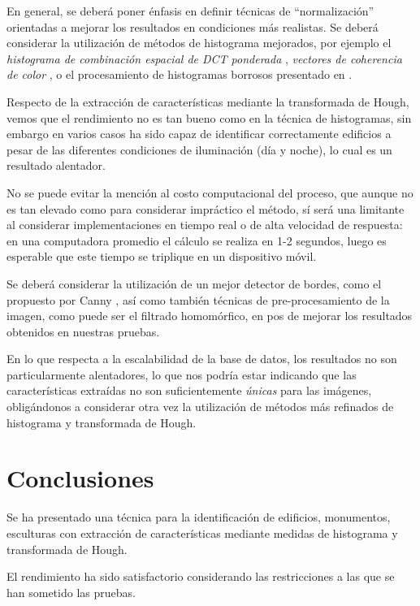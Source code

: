 \documentclass[conference,a4paper,10pt,oneside,final]{tfmpd}
\begin{document}
En general, se deberá poner énfasis en definir técnicas
de ``normalización'' orientadas a mejorar los resultados en condiciones más
realistas. Se deberá considerar la utilización de métodos de histograma
mejorados, por ejemplo el \emph{histograma de combinación espacial de DCT
ponderada} \cite{wdctsch}, \emph{vectores de coherencia de
color} \cite{Pass96histogramrefinement}, o el procesamiento de
histogramas borrosos presentado en \cite{Konstantinidis2005375}.

Respecto de la extracción de características mediante la transformada de Hough,
vemos que el rendimiento no es tan bueno como en la técnica de histogramas,
sin embargo en varios casos ha sido capaz de identificar correctamente edificios
a pesar de las diferentes condiciones de iluminación (día y noche), lo cual
es un resultado alentador.

No se puede evitar la mención al costo computacional del proceso, que aunque
no es tan elevado como para considerar impráctico el método, sí será una
limitante al considerar implementaciones en tiempo real o de alta velocidad
de respuesta: en una computadora promedio el cálculo se realiza en 1-2 segundos,
luego es esperable que este tiempo se triplique en un dispositivo móvil.

Se deberá considerar la utilización de un mejor detector de bordes, como el
propuesto por Canny \cite{canny},
así como también técnicas de pre-procesamiento de la
imagen, como puede ser el filtrado homomórfico, en pos de mejorar los
resultados obtenidos en nuestras pruebas.

En lo que respecta a la escalabilidad de la base de datos, los resultados no
son particularmente alentadores, lo que nos {podría estar
indicando que las características extraídas no son suficientemente \emph{únicas}
para las imágenes, obligándonos} a considerar otra vez la
utilización de métodos más refinados de histograma y transformada de Hough.
%
%
%
%
\section{Conclusiones}
Se ha presentado una técnica para la identificación de edificios, monumentos,
esculturas con extracción de características mediante medidas de histograma
y transformada de Hough.

El rendimiento ha sido satisfactorio considerando las restricciones a las
que se han sometido las pruebas.
\end{document}
